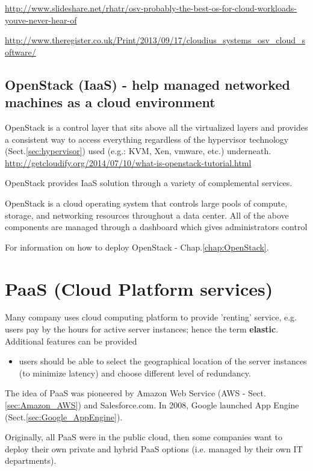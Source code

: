 \url{http://www.slideshare.net/rhatr/osv-probably-the-best-os-for-cloud-workloads-youve-never-hear-of}

\url{http://www.theregister.co.uk/Print/2013/09/17/cloudius_systems_osv_cloud_software/}



\subsection{OpenStack (IaaS) - help managed networked machines as a cloud
environment}

OpenStack is a control layer that sits above all the virtualized layers and
provides a consistent way to access everything regardless of the hypervisor
technology (Sect.\ref{sec:hypervisor}) used (e.g.: KVM, Xen, vmware, etc.)
underneath.
\url{http://getcloudify.org/2014/07/10/what-is-openstack-tutorial.html}

OpenStack provides IaaS solution through a variety of complemental services.

OpenStack is a cloud operating system that controls large pools of compute,
storage, and networking resources throughout a data center. All of the above
components are managed through a dashboard which gives administrators control



For information on how to deploy OpenStack - Chap.\ref{chap:OpenStack}.

 
\section{PaaS (Cloud Platform services)}
\label{sec:PaaS}

Many company uses cloud computing platform to provide 'renting' service, e.g.
users pay by the hours for active server instances; hence the term {\bf
elastic}. Additional features can be provided
\begin{itemize}
  \item users should be able to select the geographical location of the server
  instances (to minimize latency) and choose different level of redundancy.
\end{itemize}

The idea of PaaS was pioneered by Amazon Web Service (AWS -
Sect.\ref{sec:Amazon_AWS}) and Salesforce.com. In 2008, Google launched App
Engine (Sect.\ref{sec:Google_AppEngine}).

Originally, all PaaS were in the public cloud, then some companies want to
deploy their own private and hybrid PaaS options (i.e. managed by their own IT
departments).


